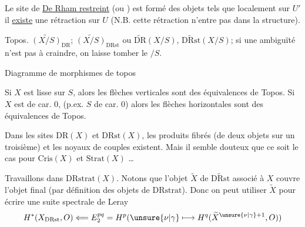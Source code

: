 Le site de \uline{De Rham restreint} (ou  \uline{}) est formé des objets tels que localement sur $U'$ il \uline{existe} une rétraction sur $U$ (N.B. cette rétraction n'entre pas dans la structure).

Topos. $\widetilde{(X/S)}_{\mathrm{DR}}$; $\widetilde{(X/S)}_{\mathrm{DRst}}$ ou  $\widetilde{\mathrm{DR}}(X/S)$, $\widetilde{\mathrm{DRst}}(X/S)$; si une ambiguïté n'est pas à craindre, on laisse tomber le $/S$.

Diagramme de morphismes de topos




Si $X$ est  lisse sur $S$, alors les flèches verticales sont des équivalences de Topos. Si $X$ est de car. 0, (p.ex. $S$ de car. 0) alors les flèches horizontales sont des équivalences de Topos.

Dans les sites $\mathrm{DR}(X)$ et $\mathrm{DRst}(X)$, les produits fibrés (de deux objets sur un troisième) et les noyaux de couples existent. Mais il semble douteux que ce soit le cas pour  $\mathrm{Cris}(X)$ et $\mathrm{Strat}(X)$ \ldots
{}


Travaillons dans $\mathrm{DRstrat}(X)$. Notons que l'objet $\widetilde X$ de $\widetilde{\mathrm{DRst}}$ associé à $X$ couvre l'objet final (par définition des objets de $\mathrm{DRstrat}$). Donc on peut utiliser  $\widetilde X$ pour écrire une suite spectrale de Leray
\[
H^*(X_{\mathrm{DRst}},O)\Longleftarrow E_2^{pq}=H^p(\unsure{\nu|\gamma}\longmapsto H^q(\widetilde X^{\unsure{\nu|\gamma}+1},O))
\]


